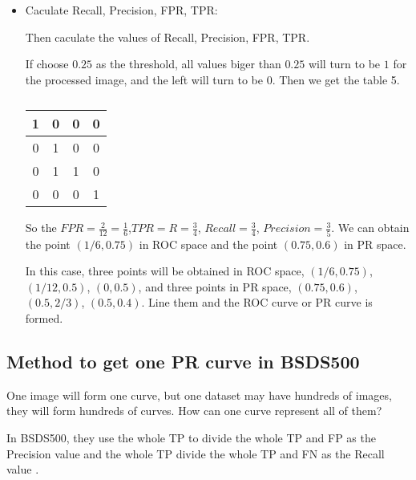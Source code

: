 \documentclass[a4paper,12pt]{article}
\begin{document}
\begin{itemize}
\item Caculate Recall, Precision, FPR, TPR: 

Then caculate the values of Recall, Precision, FPR, TPR.

If choose $0.25$ as the threshold, all values biger than $0.25$ will turn to be $1$ for the processed image, and the left will turn to be $0$. Then we get the table 5.
\begin{table}[h]
\centering
\begin{tabular}{|c|c|c|c|}
\hline
1&0&0&0\\
\hline
0&1&0&0\\
\hline
0&1&1&0\\
\hline
0&0&0&1\\
\hline
\end{tabular} 
\caption{}
\end{table}

So the $FPR=\frac{2}{12}=\frac{1}{6}$,$TPR=R=\frac{3}{4}$, $Recall=\frac{3}{4}$, $Precision=\frac{3}{5}$. We can obtain the point $(1/6,0.75)$ in ROC space and the point $(0.75,0.6)$ in PR space.

In this case, three points will be obtained in ROC space, $(1/6,0.75)$, $(1/12,0.5)$, $(0,0.5)$, and three points in PR space, $(0.75,0.6)$, $(0.5,2/3)$, $(0.5,0.4)$. Line them and the ROC curve or PR curve is formed.
\end{itemize}

\subsection{Method to get one PR curve in BSDS500}

One image will form one curve, but one dataset may have hundreds of images, they will form hundreds of curves. How can one curve represent all of them?

In BSDS500, they use the whole TP to divide the whole TP and FP as the Precision value and the whole TP divide the whole TP and FN as the Recall value \cite{4:article}.
\end{document}
